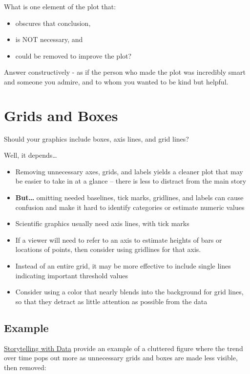 \documentclass[
  letterpaper,
  DIV=11,
  numbers=noendperiod]{scrreprt}
\providecommand{\tightlist}{%
  \setlength{\itemsep}{0pt}\setlength{\parskip}{0pt}}\usepackage{longtable,booktabs,array}
\theoremstyle{remark}
\begin{document}
What is one element of the plot that:

\begin{itemize}
\tightlist
\item
  obscures that conclusion,
\item
  is NOT necessary, and
\item
  could be removed to improve the plot?
\end{itemize}

Answer constructively - as if the person who made the plot was
incredibly smart and someone you admire, and to whom you wanted to be
kind but helpful.

\section{Grids and Boxes}\label{grids-and-boxes}

Should your graphics include boxes, axis lines, and grid lines?

Well, it depends\ldots{}

\begin{itemize}
\tightlist
\item
  Removing unnecessary axes, grids, and labels yields a cleaner plot
  that may be easier to take in at a glance -- there is less to distract
  from the main story
\item
  \textbf{But\ldots{}} omitting needed baselines, tick marks, gridlines,
  and labels can cause confusion and make it hard to identify categories
  or estimate numeric values
\item
  Scientific graphics usually need axis lines, with tick marks
\item
  If a viewer will need to refer to an axis to estimate heights of bars
  or locations of points, then consider using gridlines for that axis.
\item
  Instead of an entire grid, it may be more effective to include single
  lines indicating important threshold values
\item
  Consider using a color that nearly blends into the background for grid
  lines, so that they detract as little attention as possible from the
  data
\end{itemize}

\subsection{Example}\label{example}

\href{http://www.storytellingwithdata.com/blog/2011/07/gridlines-are-gratuitous}{Storytelling
with Data} provide an example of a cluttered figure where the trend over
time pops out more as unnecessary grids and boxes are made less visible,
then removed:
\end{document}
